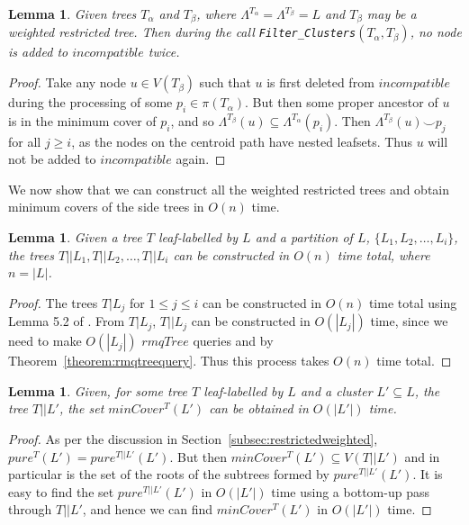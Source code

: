 \documentclass[final,1p,times]{elsarticle}
\newcommand{\compatible}{\smile}
\newcommand{\leafset}{\Lambda}
\newcommand{\TA}{T_\alpha}
\newcommand{\TB}{T_\beta}
\newtheorem{lemma}[theorem]{Lemma}
\begin{document}
    \begin{lemma}
        \label{lem:numaddednodes}
        Given trees $\TA$ and $\TB$, where $\leafset^{\TA} = \leafset^{\TB} = L$ and $\TB$ may be a weighted restricted tree. Then during the call \texttt{Filter\_Clusters}$(\TA, \TB)$, no node is added to $incompatible$ twice.
    \end{lemma}
        \begin{proof}
            Take any node $u \in V(\TB)$ such that $u$ is first deleted from $incompatible$ during the processing of some $p_i \in \pi(\TA)$. But then some proper ancestor of $u$ is in the minimum cover of $p_i$, and so $\leafset^{\TB}(u) \subseteq \leafset^{\TA}(p_i)$. Then $\leafset^{\TB}(u) \compatible p_j$ for all $j \geq i$, as the nodes on the centroid path have nested leafsets. Thus $u$ will not be added to $incompatible$ again.
        \end{proof}

    We now show that we can construct all the weighted restricted trees and obtain minimum covers of the side trees in $O(n)$ time.
    \newline

    \begin{lemma}
        \label{lem:restrictedweightedruntime}
        Given a tree $T$ leaf-labelled by $L$ and a partition of $L$, $\{L_1, L_2, \dots, L_i\}$, the trees $T||L_1, T||L_2, \dots, T||L_i$ can be constructed in $O(n)$ time total, where $n = |L|$.
    \end{lemma}
        \begin{proof}
            The trees $T|L_j$ for $1 \leq j \leq i$ can be constructed in $O(n)$ time total using Lemma 5.2 of \cite{farach1995fast}. From $T|L_j$, $T||L_j$ can be constructed in $O(|L_j|)$ time, since we need to make $O(|L_j|)$ $rmqTree$ queries and by Theorem~\ref{theorem:rmqtreequery}. Thus this process takes $O(n)$ time total.
        \end{proof}

    \medskip
    \begin{lemma}
        \label{lem:restrictedweightedmincover}
        Given, for some tree $T$ leaf-labelled by $L$ and a cluster $L' \subseteq L$, the tree $T||L'$, the set $minCover^{T}(L')$ can be obtained in $O(|L'|)$ time.
    \end{lemma}
        \begin{proof}
            As per the discussion in Section~\ref{subsec:restrictedweighted}, $pure^{T}(L') = pure^{T||L'}(L')$. But then $minCover^{T}(L') \subseteq V(T||L')$ and in particular is the set of the roots of the subtrees formed by $pure^{T||L'}(L')$. It is easy to find the set $pure^{T||L'}(L')$ in $O(|L'|)$ time using a bottom-up pass through $T||L'$, and hence we can find $minCover^{T}(L')$ in $O(|L'|)$ time.
        \end{proof}
\end{document}
